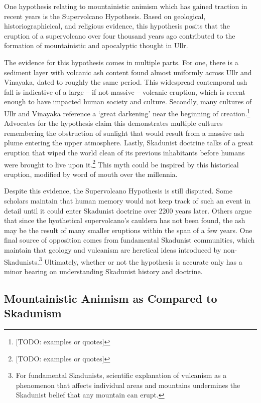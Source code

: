 One hypothesis relating to mountainistic animism which has gained traction in recent years is the Supervolcano Hypothesis. Based on geological, historiographicical, and religious evidence, this hypothesis posits that the eruption of a supervolcano over four thousand years ago contributed to the formation of mountainistic and apocalyptic thought in Ullr. \par 

The evidence for this hypothesis comes in multiple parts. For one, there is a sediment layer with volcanic ash content found almost uniformly across Ullr and Vinayaka, dated to roughly the same period. This widespread contemporal ash fall is indicative of a large -- if not massive -- volcanic eruption, which is recent enough to have impacted human society and culture. Secondly, many cultures of Ullr and Vinayaka reference a `great darkening' near the beginning of creation.\footnote{[TODO: examples or quotes]} Advocates for the hypothesis claim this demonstrates multiple cultures remembering the obstruction of sunlight that would result from a massive ash plume entering the upper atmosphere. Lastly, Skadunist doctrine talks of a great eruption that wiped the world clean of its previous inhabitants before humans were brought to live upon it.\footnote{[TODO: examples or quotes]} This myth could be inspired by this historical eruption, modified by word of mouth over the millennia.\par 

Despite this evidence, the Supervolcano Hypothesis is still disputed. Some scholars maintain that human memory would not keep track of such an event in detail until it could enter Skadunist doctrine over 2200 years later. Others argue that since the hyothetical supervolcano's cauldera has not been found, the ash may be the result of many smaller eruptions within the span of a few years. One final source of opposition comes from fundamental Skadunist communities, which maintain that geology and vulcanism are heretical ideas introduced by non-Skadunists.\footnote{For fundamental Skadunists, scientific explanation of vulcanism as a phenomenon that affects individual areas and mountains undermines the Skadunist belief that any mountain can erupt.} Ultimately, whether or not the hypothesis is accurate only has a minor bearing on understanding Skadunist history and doctrine.

\subsection{Mountainistic Animism as Compared to Skadunism}


 


